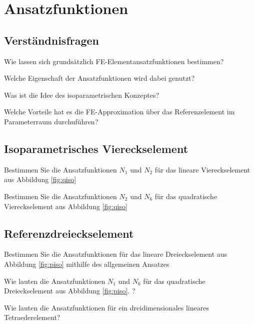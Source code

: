\clearpage
\setcounter{page}{1}

\section{Ansatzfunktionen}


\subsection{Verständnisfragen}

\enab
\item Wie lassen sich grundsätzlich FE-Elementansatzfunktionen bestimmen?
\item Welche Eigenschaft der Ansatzfunktionen wird dabei genutzt?
\item Was ist die Idee des isoparametrischen Konzeptes? 
\item Welche Vorteile hat es die FE-Approximation über das Referenzelement im Parameterraum durchuführen?
\enae

\subsection{Isoparametrisches Viereckselement}


{\center\begin{minipage}[t]{0.36\textwidth}

\end{minipage}
\begin{minipage}[t]{0.36\textwidth}

\end{minipage}
\label{fig:qiso}
}

\enab
\item Bestimmen Sie die Ansatzfunktionen $N_1$ und $N_2$ für das lineare Viereckselement aus Abbildung \ref{fig:qiso}
\item Bestimmen Sie die Ansatzfunktionen $N_2$ und $N_6$ für das quadratische Viereckselement aus Abbildung \ref{fig:qiso}
\enae


\clearpage
\subsection{Referenzdreieckselement}


{\center\begin{minipage}[t]{0.36\textwidth}

\end{minipage}
\begin{minipage}[t]{0.36\textwidth}

\end{minipage}
\label{fig:piso}
}


\enab
\item Bestimmen Sie die Ansatzfunktionen für das lineare Dreieckselement aus Abbildung \ref{fig:piso} mithilfe des allgemeinen Ansatzes
\item Wie lauten die Ansatzfunktionen $N_1$ und $N_6$ für das quadratische Dreieckselement aus Abbildung \ref{fig:piso}. ?
\item Wie lauten die Ansatzfunktionen für ein dreidimensionales lineares Tetraederelement?
\enae